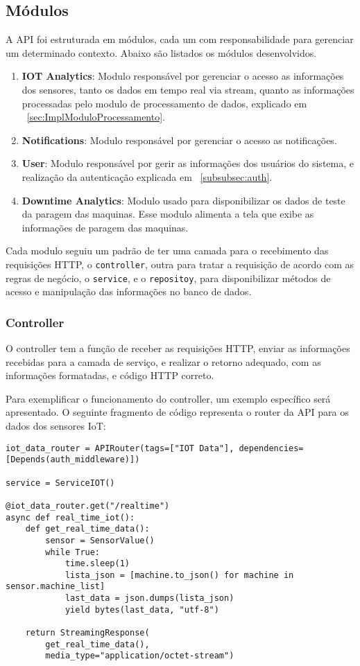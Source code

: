 \subsection{Módulos}\label{subsec:modules}
A \gls{API} foi estruturada em módulos, cada um com responsabilidade para gerenciar um determinado contexto. Abaixo são listados os módulos desenvolvidos.

\begin{enumerate}
    \item \textbf{IOT Analytics}: Modulo responsável por gerenciar o acesso as informações dos sensores, tanto os dados em tempo real via stream, quanto as informações processadas pelo modulo de processamento de dados, explicado em ~\ref{sec:ImplModuloProcessamento}.
    \item \textbf{Notifications}: Modulo responsável por gerenciar o acesso as notificações.
    \item \textbf{User}: Modulo responsável por gerir as informações dos usuários do sistema, e realização da autenticação explicada em ~\ref{subsubsec:auth}.
    \item \textbf{Downtime Analytics}: Modulo usado para disponibilizar os dados de teste da paragem das maquinas. Esse modulo alimenta a tela que exibe as informações de paragem das maquinas.

\end{enumerate}

Cada modulo seguiu um padrão de ter uma camada para o recebimento  das requisições \gls{HTTP}, o \texttt{controller}, outra para tratar a requisição de acordo com as regras de negócio, o \texttt{service}, e o \texttt{repositoy}, para disponibilizar métodos de acesso e manipulação das informações no banco de dados.

\subsubsection{Controller}\label{subsubsec:controller}
O controller tem a função de receber as requisições \gls{HTTP}, enviar as informações recebidas para a camada de serviço, e realizar o retorno adequado, com as informações formatadas, e código \gls{HTTP} correto.


Para exemplificar o funcionamento do controller, um exemplo específico será apresentado. O seguinte fragmento de código representa o router da \gls{API} para os dados dos sensores \gls{IoT}:

\begin{verbatim}
iot_data_router = APIRouter(tags=["IOT Data"], dependencies=[Depends(auth_middleware)])

service = ServiceIOT()

@iot_data_router.get("/realtime")
async def real_time_iot(): 
    def get_real_time_data():
        sensor = SensorValue()
        while True:
            time.sleep(1)
            lista_json = [machine.to_json() for machine in sensor.machine_list]
            last_data = json.dumps(lista_json)
            yield bytes(last_data, "utf-8")

    return StreamingResponse(
        get_real_time_data(),
        media_type="application/octet-stream")
\end{verbatim}


